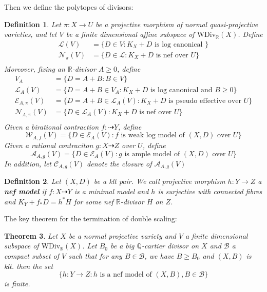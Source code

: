 \documentclass{article}
\newtheorem{defn}{Definition}[section]
\newtheorem{thm}[defn]{Theorem}
\begin{document}
Then we define the polytopes of divisors: 
\begin{defn}
	Let $ \pi:X\to U $ be a projective morphism of normal quasi-projective varieties, and  let $ V $ be a finite dimensional affine subspace of $ \mathrm{WDiv}_\mathbb{R}(X) $. Define
	\begin{equation*}
		\begin{aligned}
			\mathcal{L}(V)&=\{D\in V: K_X+D \text{ is log canonical }\} \\
			 \mathcal{N}_\pi(V)&=\{D\in\mathcal{L}:K_X+D \text{ is nef over } U\}\\
		\end{aligned}
	\end{equation*}
	Moreover, fixing an $ \mathbb{R} $-divisor $ A\geqslant 0 $, define
		\begin{equation*}
		\begin{aligned}
			V_A&=\{D=A+B:B\in V\}\\
			\mathcal{L}_A(V)&=\{D=A+B\in V_A: K_X+D \text{ is log canonical and  } B\geqslant0 \}\\
			\mathcal{E}_{A,\pi}(V)&=\{D=A+B\in \mathcal{L}_A(V): K_X+D \text{ is pseudo effective over } U\}\\ 
			\mathcal{N}_{A,\pi}(V)&=\{D\in\mathcal{L}_A(V):K_X+D \text{ is nef over } U\}\\
		\end{aligned}
	\end{equation*}
	Given a birational contraction $ f:\dashrightarrow Y $, define
	$$ \mathcal{W}_{A,f}(V)=\{D\in \mathcal{E}_{A}(V): f \text{ is weak log model of  } (X,D) \text{ over }U\} $$
	Given a rational contraciton $g:X\dashrightarrow Z  $ over $ U $, define
	$$ \mathcal{A}_{A,g}(V)=\{D\in \mathcal{E}_{A}(V): g \text{ is ample model of  } (X,D) \text{ over }U\} $$
	In addition, let $ \mathcal{C}_{A,g}(V) $ denote the closure of $ \mathcal{A}_{A,g}(V) $
\end{defn}
\begin{defn}
	Let $ (X,D) $ be a klt pair. We call  projective morphism  $ h:Y\to Z $ a \textbf{nef model} if $ f:X\dashrightarrow Y $ is a minimal model and $ h $ is surjective with connected fibres and $ K_Y+f_*D=h^*H $ for some nef $ \mathbb{R} $-divisor $ H $ on $ Z $.
\end{defn}
The key theorem for the termination of double scaling:
\begin{thm}
Let $ X $ be a normal projective variety and $ V $ a finite dimensional subspace of $ \mathrm{WDiv}_\mathbb{R}(X) $. Let $ B_0 $ be a big $ \mathbb{Q}$-cartier divisor on $ X $ and $ \mathcal{B} $ a compact subset of $ V $ such that for any $ B\in \mathcal{B} $, we have $ B\geqslant B_0 $ and $ (X,B) $ is klt. then the set
$$ \{h:Y\to Z:  h \text{ is a nef model of } (X,B), B\in\mathcal{B} \} $$
is finite.
\end{thm}
\end{document}
